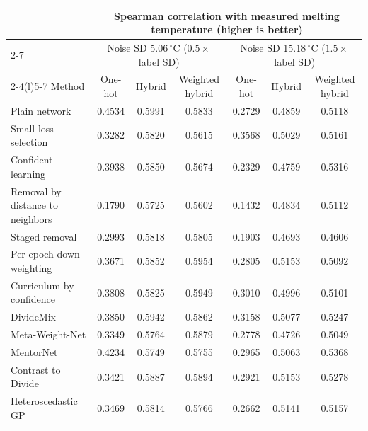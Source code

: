 \begin{table}[htbp]
\centering
\small
\begin{tabular}{@{}lcccccc@{}}
\toprule
 & \multicolumn{6}{c}{Spearman correlation with measured melting temperature (higher is better)} \\
\cmidrule(l){2-7}
 & \multicolumn{3}{c}{Noise SD 5.06\,$^\circ$C ($0.5\times$ label SD)} & \multicolumn{3}{c}{Noise SD 15.18\,$^\circ$C ($1.5\times$ label SD)} \\
\cmidrule(lr){2-4}\cmidrule(l){5-7}
Method & One-hot & Hybrid & Weighted hybrid & One-hot & Hybrid & Weighted hybrid \\
\midrule
Plain network & 0.4534 & 0.5991 & 0.5833 & 0.2729 & 0.4859 & 0.5118 \\
\midrule
Small-loss selection & 0.3282 & 0.5820 & 0.5615 & 0.3568 & 0.5029 & 0.5161 \\
Confident learning & 0.3938 & 0.5850 & 0.5674 & 0.2329 & 0.4759 & 0.5316 \\
Removal by distance to neighbors & 0.1790 & 0.5725 & 0.5602 & 0.1432 & 0.4834 & 0.5112 \\
Staged removal & 0.2993 & 0.5818 & 0.5805 & 0.1903 & 0.4693 & 0.4606 \\
\midrule
Per-epoch down-weighting & 0.3671 & 0.5852 & 0.5954 & 0.2805 & 0.5153 & 0.5092 \\
Curriculum by confidence & 0.3808 & 0.5825 & 0.5949 & 0.3010 & 0.4996 & 0.5101 \\
DivideMix & 0.3850 & 0.5942 & 0.5862 & 0.3158 & 0.5077 & 0.5247 \\
Meta-Weight-Net & 0.3349 & 0.5764 & 0.5879 & 0.2778 & 0.4726 & 0.5049 \\
MentorNet & 0.4234 & 0.5749 & 0.5755 & 0.2965 & 0.5063 & 0.5368 \\
Contrast to Divide & 0.3421 & 0.5887 & 0.5894 & 0.2921 & 0.5153 & 0.5278 \\
\midrule
Heteroscedastic GP & 0.3469 & 0.5814 & 0.5766 & 0.2662 & 0.5141 & 0.5157 \\

\end{tabular}
\end{table}
